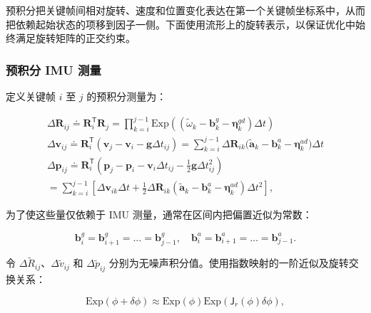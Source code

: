 预积分把关键帧间相对旋转、速度和位置变化表达在第一个关键帧坐标系中，从而把依赖起始状态的项移到因子一侧。下面使用流形上的旋转表示，以保证优化中始终满足旋转矩阵的正交约束。

\subsubsection{预积分 IMU 测量}

定义关键帧 $i$ 至 $j$ 的预积分测量为：

\begin{equation}
\begin{array}{l} \Delta \boldsymbol {R} _ {i j} \doteq \boldsymbol {R} _ {i} ^ {\mathsf {T}} \boldsymbol {R} _ {j} = \prod_ {k = i} ^ {j - 1} \mathrm{Exp} \left(\left(\tilde {\omega} _ {k} - \mathbf {b} _ {k} ^ {g} - \boldsymbol {\eta} _ {k} ^ {g d}\right) \Delta t\right) \\ \Delta \boldsymbol {v} _ {i j} \doteq \boldsymbol {R} _ {i} ^ {\mathsf {T}} (\boldsymbol {v} _ {j} - \boldsymbol {v} _ {i} - \mathbf {g} \Delta t _ {i j}) = \sum_ {k = i} ^ {j - 1} \Delta \boldsymbol {R} _ {i k} \big (\tilde {\mathbf {a}} _ {k} - \mathbf {b} _ {k} ^ {a} - \boldsymbol {\eta} _ {k} ^ {a d} \big) \Delta t \\ \Delta \boldsymbol {p} _ {i j} \doteq \boldsymbol {R} _ {i} ^ {\mathsf {T}} (\boldsymbol {p} _ {j} - \boldsymbol {p} _ {i} - \boldsymbol {v} _ {i} \Delta t _ {i j} - \frac {1}{2} \mathbf {g} \Delta t _ {i j} ^ {2}) \\ = \sum_ {k = i} ^ {j - 1} \left[ \Delta \boldsymbol {v} _ {i k} \Delta t + \frac {1}{2} \Delta \boldsymbol {R} _ {i k} (\tilde {\mathbf {a}} _ {k} - \mathbf {b} _ {k} ^ {a} - \boldsymbol {\eta} _ {k} ^ {a d}) \Delta t ^ {2} \right], \end{array}\tag{11.14}
\end{equation}

为了使这些量仅依赖于 IMU 测量，通常在区间内把偏置近似为常数：

\begin{equation}
\mathbf {b} _ {i} ^ {g} = \mathbf {b} _ {i + 1} ^ {g} = \ldots = \mathbf {b} _ {j - 1} ^ {g}, \quad \mathbf {b} _ {i} ^ {a} = \mathbf {b} _ {i + 1} ^ {a} = \ldots = \mathbf {b} _ {j - 1} ^ {a}.\tag{11.15}
\end{equation}

令 $\Delta\tilde R_{ij}$、$\Delta\tilde v_{ij}$ 和 $\Delta\tilde p_{ij}$ 分别为无噪声积分值。使用指数映射的一阶近似及旋转交换关系：

\begin{equation}
\mathrm{Exp} (\phi + \delta \phi) \approx \mathrm{Exp} (\phi) \mathrm{Exp} (\mathsf {J} _ {r} (\phi) \delta \phi),\tag{11.16}
\end{equation}


